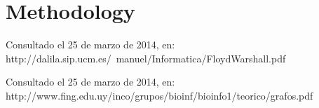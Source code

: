 \documentclass[letterpaper]{article}
\begin{document}
\section{Methodology}


\begin{thebibliography}{99}
Consultado el 25 de marzo de 2014, en: http://dalila.sip.ucm.es/~manuel/Informatica/FloydWarshall.pdf

Consultado el 25 de marzo de 2014, en: http://www.fing.edu.uy/inco/grupos/bioinf/bioinfo1/teorico/grafos.pdf

\end{thebibliography}
\end{document}
